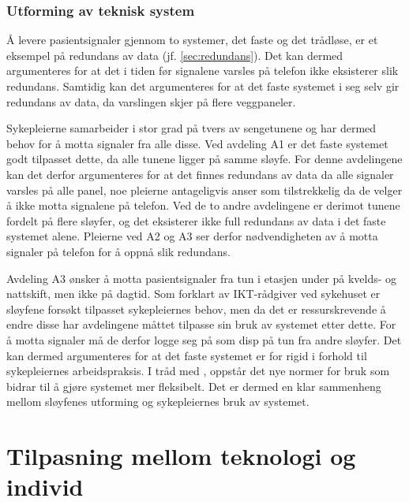 \subsubsection{Utforming av teknisk system}
Å levere pasientsignaler gjennom to systemer, det faste og det trådløse, er et eksempel på redundans av data (jf. \ref{sec:redundans}). Det kan dermed argumenteres for at det i tiden før signalene varsles på telefon ikke eksisterer slik redundans. Samtidig kan det argumenteres for at det faste systemet i seg selv gir redundans av data, da varslingen skjer på flere veggpaneler. 

\noindent
Sykepleierne samarbeider i stor grad på tvers av sengetunene og har dermed behov for å motta signaler fra alle disse. Ved avdeling A1 er det faste systemet godt tilpasset dette, da alle tunene ligger på samme sløyfe. For denne avdelingene kan det derfor argumenteres for at det finnes redundans av data da alle signaler varsles på alle panel, noe pleierne antageligvis anser som tilstrekkelig da de velger å ikke motta signalene på telefon. Ved de to andre avdelingene er derimot tunene fordelt på flere sløyfer, og det eksisterer ikke full redundans av data i det faste systemet alene. Pleierne ved A2 og A3 ser derfor nødvendigheten av å motta signaler på telefon for å oppnå slik redundans. 

\noindent
Avdeling A3 ønsker å motta pasientsignaler fra tun i etasjen under på kvelds- og nattskift, men ikke på dagtid. Som forklart av IKT-rådgiver ved sykehuset er sløyfene forsøkt tilpasset sykepleiernes behov, men da det er ressurskrevende å endre disse har avdelingene måttet tilpasse sin bruk av systemet etter dette. For å motta signaler må de derfor logge seg på som disp på tun fra andre sløyfer. Det kan dermed argumenteres for at det faste systemet er for rigid i forhold til sykepleiernes arbeidspraksis. I tråd med \citep{Ackermann00}, oppstår det nye normer for bruk som bidrar til å gjøre systemet mer fleksibelt. Det er dermed en klar sammenheng mellom sløyfenes utforming og sykepleiernes bruk av systemet.

\section{Tilpasning mellom teknologi og individ}

